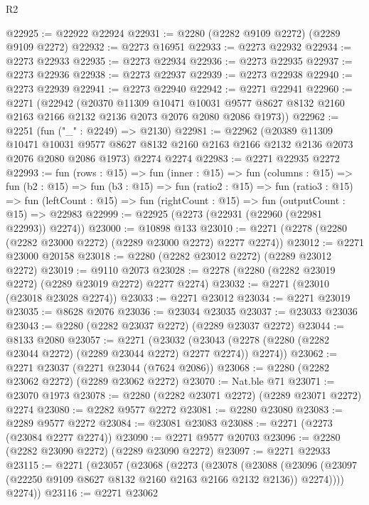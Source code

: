 \begin{lexlean}{R2}
\begin{coremodule}
@22925 := @22922 @22924
@22931 := @2280 (@2282 @9109 @2272) (@2289 @9109 @2272)
@22932 := @2273 @16951
@22933 := @2273 @22932
@22934 := @2273 @22933
@22935 := @2273 @22934
@22936 := @2273 @22935
@22937 := @2273 @22936
@22938 := @2273 @22937
@22939 := @2273 @22938
@22940 := @2273 @22939
@22941 := @2273 @22940
@22942 := @2271 @22941
@22960 := @2271
    (@22942
      (@20370
        @11309
        @10471
        @10031
        @9577
        @8627
        @8132
        @2160
        @2163
        @2166
        @2132
        @2136
        @2073
        @2076
        @2080
        @2086
        @1973))
@22962 := @2251 (fun ("_" : @2249) => @2130)
@22981 := @22962
    (@20389
      @11309
      @10471
      @10031
      @9577
      @8627
      @8132
      @2160
      @2163
      @2166
      @2132
      @2136
      @2073
      @2076
      @2080
      @2086
      @1973)
    @2274
    @2274
@22983 := @2271 @22935 @2272
@22993 := fun (rows : @15) =>
  fun (inner : @15) =>
  fun (columns : @15) =>
  fun (b2 : @15) =>
  fun (b3 : @15) =>
  fun (ratio2 : @15) =>
  fun (ratio3 : @15) =>
  fun (leftCount : @15) => fun (rightCount : @15) => fun (outputCount : @15) => @22983
@22999 := @22925 (@2273 (@22931 (@22960 (@22981 @22993)) @2274))
@23000 := @10898 @133
@23010 := @2271 (@2278 (@2280 (@2282 @23000 @2272) (@2289 @23000 @2272) @2277 @2274))
@23012 := @2271 @23000 @20158
@23018 := @2280 (@2282 @23012 @2272) (@2289 @23012 @2272)
@23019 := @9110 @2073
@23028 := @2278 (@2280 (@2282 @23019 @2272) (@2289 @23019 @2272) @2277 @2274)
@23032 := @2271 (@23010 (@23018 @23028 @2274))
@23033 := @2271 @23012
@23034 := @2271 @23019
@23035 := @8628 @2076
@23036 := @23034 @23035
@23037 := @23033 @23036
@23043 := @2280 (@2282 @23037 @2272) (@2289 @23037 @2272)
@23044 := @8133 @2080
@23057 := @2271
    (@23032 (@23043 (@2278 (@2280 (@2282 @23044 @2272) (@2289 @23044 @2272) @2277 @2274)) @2274))
@23062 := @2271 @23037 (@2271 @23044 (@7624 @2086))
@23068 := @2280 (@2282 @23062 @2272) (@2289 @23062 @2272)
@23070 := Nat.ble @71
@23071 := @23070 @1973
@23078 := @2280 (@2282 @23071 @2272) (@2289 @23071 @2272) @2274
@23080 := @2282 @9577 @2272
@23081 := @2280 @23080
@23083 := @2289 @9577 @2272
@23084 := @23081 @23083
@23088 := @2271 (@2273 (@23084 @2277 @2274))
@23090 := @2271 @9577 @20703
@23096 := @2280 (@2282 @23090 @2272) (@2289 @23090 @2272)
@23097 := @2271 @22933
@23115 := @2271
    (@23057
      (@23068
        (@2273
          (@23078
            (@23088
              (@23096 (@23097 (@22250 @9109 @8627 @8132 @2160 @2163 @2166 @2132 @2136)) @2274))))
        @2274))
@23116 := @2271 @23062

\end{coremodule}
\end{lexlean}
